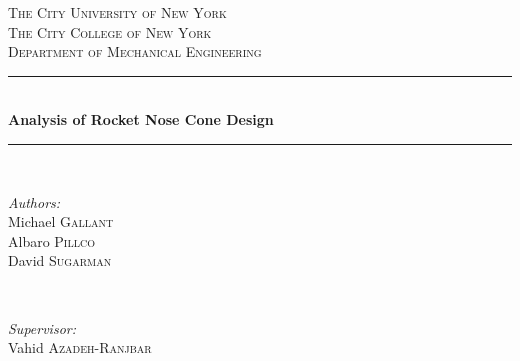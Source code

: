\documentclass[12pt,letterpaper,notitlepage]{article}
\begin{document}
\begin{titlepage}

\newcommand{\HRule}{\rule{\linewidth}{0.5mm}} %

\center %


\textsc{\LARGE The City University of New York}\\[1cm] %
\textsc{\Large The City College of New York}\\[0.5cm] %
\textsc{\large Department of Mechanical Engineering}\\[0.5cm] %


\HRule \\[0.4cm]
{ \huge \bfseries Analysis of Rocket Nose Cone Design}\\[0.4cm] %
\HRule \\[1.5cm]


\begin{minipage}{0.4\textwidth}
\begin{flushleft} \large
\emph{Authors:}\\
Michael \textsc{Gallant}\\
Albaro \textsc{Pillco}\\
David \textsc{Sugarman}\\
\end{flushleft}
\end{minipage}
~
\begin{minipage}{0.4\textwidth}
\begin{flushright} \large
\emph{Supervisor:} \\
Vahid \textsc{Azadeh-Ranjbar} %
\end{flushright}
\end{minipage}\\[2cm]


\end{titlepage}
\end{document}
